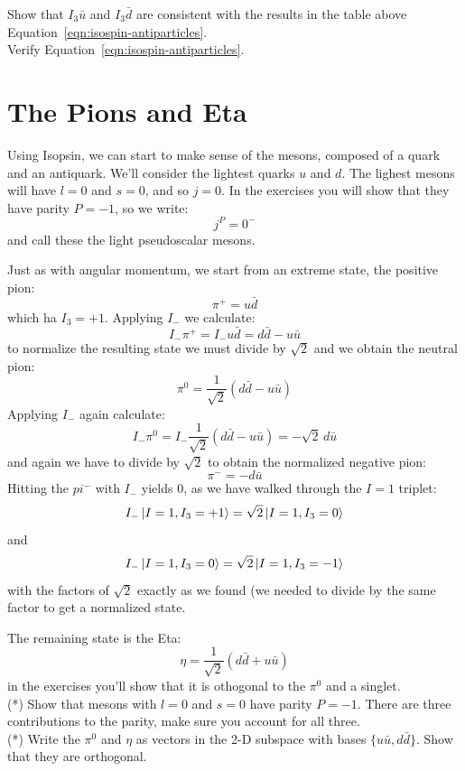 \documentclass[12pt]{article}
\begin{document}
\exercise  Show that $I_3 \bar{u}$ and $I_3 \bar{d}$ are consistent with the results in the table above Equation~\ref{eqn:isospin-antiparticles}.\\[5pt]

\exercise Verify Equation~\ref{eqn:isospin-antiparticles}.\\[5pt]

\section*{The Pions and Eta}

Using Isopsin, we can start to make sense of the mesons, composed
of a quark and an antiquark.  We'll consider the lightest quarks $u$
and $d$.  The lighest mesons will have $l=0$ and $s=0$, and so $j=0$.
In the exercises you will show that they have parity $P=-1$, so we
write:
$$j^P = 0^-$$
and call these the light pseudoscalar mesons.

Just as with angular momentum, we start from an extreme state, the positive pion:
$$\pi^+ = u \bar{d}$$
which ha $I_3 = +1$.  Applying $I_-$ we calculate:
$$I_- \pi^+ = I_- u \bar{d} = d \bar{d} - u \bar{u}$$
to normalize the resulting state we must divide by $\sqrt{2}$ and we obtain the neutral pion:
$$\pi^0 = \frac{1}{\sqrt{2}} (d \bar{d} - u \bar{u})$$
Applying $I_-$ again calculate:
$$I_- \pi^0 = I_- \frac{1}{\sqrt{2}} (d \bar{d} - u \bar{u}) = -\sqrt{2} \, d \bar{u}$$
and again we have to divide by $\sqrt{2}$ to obtain the normalized negative pion:
$$\pi^- = - d \bar{u} $$
Hitting the $pi^-$ with $I_-$ yields 0, as we have walked through the $I=1$ triplet:
$$I_- \ket{I=1, I_3=+1} = \sqrt{2} \ket{I=1, I_3=0} $$
and 
$$I_- \ket{I=1, I_3=0} = \sqrt{2} \ket{I=1, I_3=-1} $$
with the factors of $\sqrt{2}$ exactly as we found (we needed to divide
by the same factor to get a normalized state.

The remaining state is the Eta:
$$\eta = \frac{1}{\sqrt{2}} (d \bar{d} + u \bar{u})$$
in the exercises you'll show that it is othogonal to the $\pi^0$ and a singlet.\\[5pt]


\exercise (*) Show that mesons with $l=0$ and $s=0$ have parity $P=-1$.
There are three contributions to the parity, make sure you account
for all three.\\[5pt]

\exercise  (*) Write the $\pi^0$ and $\eta$ as vectors in the 2-D subspace
with bases $\{u \bar{u}, d \bar{d}\}$.  Show that they are orthogonal.\\[5pt]
\end{document}
